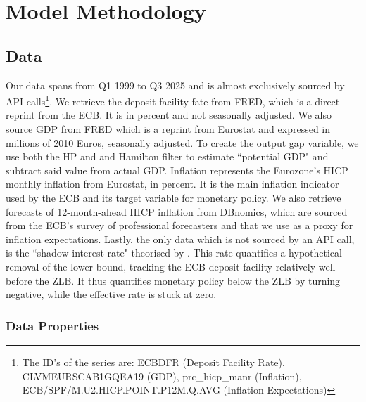 \section{Model Methodology}\label{sec:model}

\subsection{Data}

Our data spans from Q1 1999 to Q3 2025 and is almost exclusively sourced by API calls\footnote{The ID's of the series are: ECBDFR (Deposit Facility Rate), CLVMEURSCAB1GQEA19 (GDP), prc\_hicp\_manr (Inflation), ECB/SPF/M.U2.HICP.POINT.P12M.Q.AVG (Inflation Expectations) }. We retrieve the deposit facility fate from FRED, which is a direct reprint from the ECB. It is in percent and not seasonally adjusted. We also source GDP from FRED which is a reprint from Eurostat and expressed in millions of 2010 Euros, seasonally adjusted. To create the output gap variable, we use both the HP and and Hamilton filter to estimate ``potential GDP" and subtract said value from actual GDP. Inflation represents the Eurozone's HICP monthly inflation from Eurostat, in percent. It is the main inflation indicator used by the ECB and its target variable for monetary policy. We also retrieve forecasts of 12-month-ahead HICP inflation from DBnomics, which are sourced from the ECB's survey of professional forecasters and that we use as a proxy for inflation expectations. Lastly, the only data which is not sourced by an API call, is the ``shadow interest rate" theorised by \cite{wuNegativeInterestRate2020, wu2016measuring, wuTimeVaryingLowerBound2017}. This rate quantifies a hypothetical removal of the lower bound, tracking the ECB deposit facility relatively well before the ZLB. It thus quantifies monetary policy below the ZLB by turning negative, while the effective rate is stuck at zero. 

\subsubsection{Data Properties}

